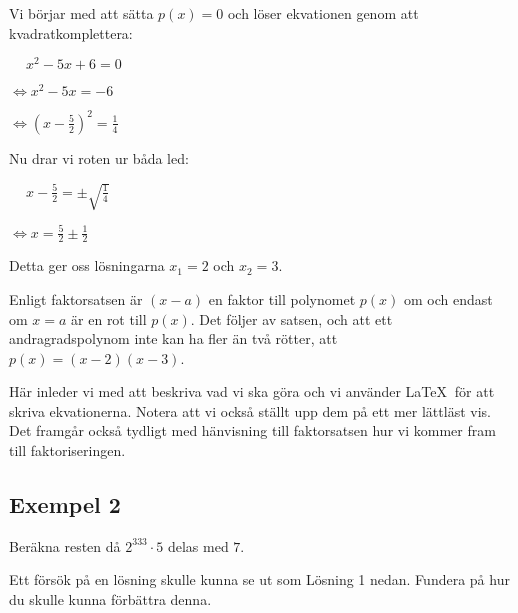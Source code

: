\documentclass[titlepage]{article}
\begin{document}
\begin{center}
\begin{tcolorbox}[width=\linewidth,colback={green!25!white},title={\textbf{Lösning 2 - Bättre}},outer arc=0mm,colupper=black]    
    Vi börjar med att sätta $p(x)=0$ och löser ekvationen genom att kvadratkomplettera:
    \vspace{2mm}

    $\quad \: x^2-5x+6 = 0$

    $\Leftrightarrow x^2-5x = -6$

    $\Leftrightarrow(x-\frac{5}{2})^2 = \frac{1}{4}$
    \vspace{2mm}

    Nu drar vi roten ur båda led:
    \vspace{2mm}

    $\quad \: x-\frac{5}{2} = \pm \sqrt{\frac{1}{4}}$

    $\Leftrightarrow x = \frac{5}{2} \pm \frac{1}{2}$
    \vspace{2mm}

    Detta ger oss lösningarna $x_1 = 2$ och $x_2=3$.

    Enligt faktorsatsen är $(x-a)$ en faktor till polynomet $p(x)$ om och endast om $x = a$ är en rot till $p(x)$. Det följer av satsen, och att ett andragradspolynom inte kan ha fler än två rötter, att $p(x) = (x-2)(x-3)$.
\end{tcolorbox} 
\end{center}

Här inleder vi med att beskriva vad vi ska göra och vi använder \LaTeX$\:$ för att skriva ekvationerna. Notera att vi också ställt upp dem på ett mer lättläst vis. Det framgår också tydligt med hänvisning till faktorsatsen hur vi kommer fram till faktoriseringen.



\subsection*{Exempel 2}

\begin{center}
\begin{tcolorbox}[width=\linewidth,colback={white},title={\textbf{Problem}},outer arc=0mm,colupper=black]
    Beräkna resten då $2^{333}\cdot5$ delas med $7$.
\end{tcolorbox} 
\end{center}

Ett försök på en lösning skulle kunna se ut som Lösning 1 nedan. Fundera på hur du skulle kunna förbättra denna.
\end{document}
